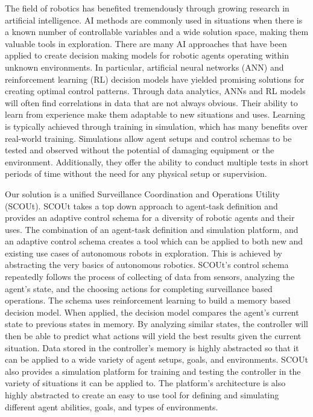 The field of robotics has benefited tremendously through growing research in artificial intelligence.
AI methods are commonly used in situations when there is a known number of controllable variables and a wide solution space, making them valuable tools in exploration.
There are many AI approaches that have been applied to create decision making models for robotic agents operating within unknown environments.
In particular, artificial neural networks (ANN) and reinforcement learning (RL) decision models have yielded promising solutions for creating optimal control patterns.
Through data analytics, ANNs and RL models will often find correlations in data that are not always obvious.
Their ability to learn from experience make them adaptable to new situations and uses.
Learning is typically achieved through training in simulation, which has many benefits over real-world training.
Simulations allow agent setups and control schemas to be tested and observed without the potential of damaging equipment or the environment.
Additionally, they offer the ability to conduct multiple tests in short periods of time without the need for any physical setup or supervision.

Our solution is a unified Surveillance Coordination and Operations Utility (SCOUt).
SCOUt takes a top down approach to agent-task definition and provides an adaptive control schema for a diversity of robotic agents and their uses.
The combination of an agent-task definition and simulation platform, and an adaptive control schema creates a tool which can be applied to both new and existing use cases of autonomous robots in exploration.
This is achieved by abstracting the very basics of autonomous robotics.
SCOUt's control schema repeatedly follows the process of collecting of data from sensors, analyzing the agent's state, and the choosing actions for completing surveillance based operations.
The schema uses reinforcement learning to build a memory based decision model.
When applied, the decision model compares the agent's current state to previous states in memory.
By analyzing similar states, the controller will then be able to predict what actions will yield the best results given the current situation.
Data stored in the controller's memory is highly abstracted so that it can be applied to a wide variety of agent setups, goals, and environments.
SCOUt also provides a simulation platform for training and testing the controller in the variety of situations it can be applied to.
The platform's architecture is also highly abstracted to create an easy to use tool for defining and simulating different agent abilities, goals, and types of environments.

